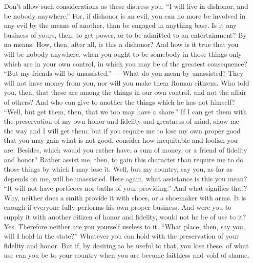 Don't  allow such  considerations  as  these distress  you.  ``I  will live  in
dishonor, and  be nobody anywhere.''  For, if dishonor is  an evil, you  can no
more  be involved  in any  evil by  the means  of another,  than be  engaged in
anything  base. Is  it any  business of  yours, then,  to get  power, or  to be
admitted to  an entertainment?  By no means.  How, then, after  all, is  this a
dishonor? And how is  it true that you will be nobody  anywhere, when you ought
to be somebody in those things only which are in your own control, in which you
may be of the greatest consequence?  ``But my friends will be unassisted.'' ---
What do you mean by unassisted? They will not have money from you, nor will you
make them Roman citizens.  Who told you, then, that these  are among the things
in our own control,  and not the affair of others? And who  can give to another
the things which  he has not himself?  ``Well, but get them, then,  that we too
may have a share.'' If I can get them with the preservation of my own honor and
fidelity and greatness of mind, show me the way and I will get them; but if you
require me  to lose  my own proper  good that  you may gain  what is  not good,
consider how inequitable  and foolish you are. Besides, which  would you rather
have, a  sum of money,  or a  friend of fidelity  and honor? Rather  assist me,
then, to gain this character than require me  to do those things by which I may
lose it.  Well, but  my country,  say you,  as far  as depends  on me,  will be
unassisted. Here  again, what assistance is  this you mean? ``It  will not have
porticoes nor baths of your providing.''  And what signifies that? Why, neither
does a smith provide  it with shoes, or a shoemaker with arms.  It is enough if
everyone fully performs his own proper business. And were you to supply it with
another citizen  of honor  and fidelity,  would not he  be of  use to  it? Yes.
Therefore neither are you yourself useless  to it. ``What place, then, say you,
will I hold in the state?'' Whatever you can hold with the preservation of your
fidelity and honor. But  if, by desiring to be useful to  that, you lose these,
of what use can  you be to your country when you are  become faithless and void
of shame.
